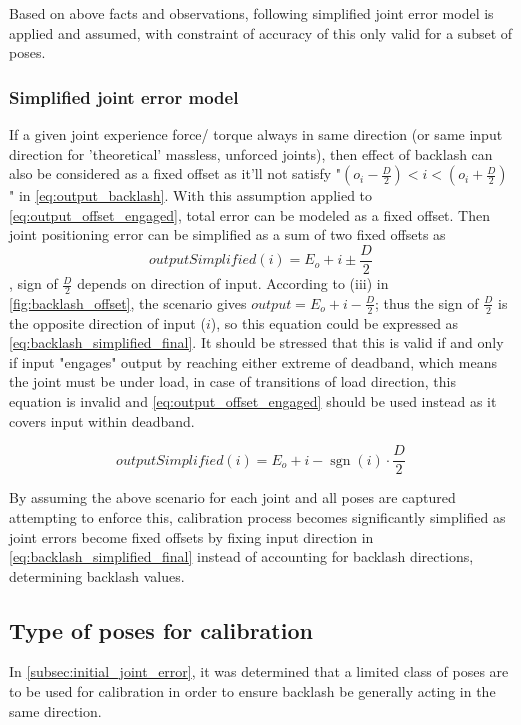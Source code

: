 \documentclass[english, printversion, nomenclature, notitle]{tuvisionthesis} %
\DeclareMathOperator{\sgn}{sgn}
\begin{document}
Based on above facts and observations, following simplified joint error model is applied and assumed, with constraint of accuracy of this only valid for a subset of poses.

\subsubsection{Simplified joint error model}
\label{subsubsec:simplified_joint_error_model}
If a given joint experience force/ torque always in same direction (or same input direction for 'theoretical' massless, unforced joints), then effect of backlash can also be considered as a fixed offset as it'll not satisfy "$(o_i - \frac{D}{2}) < i < (o_i + \frac{D}{2})$" in \cref{eq:output_backlash}. With this assumption applied to \cref{eq:output_offset_engaged}, total error can be modeled as a fixed offset. Then joint positioning error can be simplified as a sum of two fixed offsets as \[outputSimplified(i) = E_o + i \pm \frac{D}{2}\], sign of $\frac{D}{2}$ depends on direction of input. According to (iii) in \cref{fig:backlash_offset}, the scenario gives $output = E_o + i - \frac{D}{2}$; thus the sign of $\frac{D}{2}$ is the opposite direction of input ($i$), so this equation could be expressed as \cref{eq:backlash_simplified_final}. It should be stressed that this is valid if and only if input "engages" output by reaching either extreme of deadband, which means the joint must be under load, in case of transitions of load direction, this equation is invalid and \cref{eq:output_offset_engaged} should be used instead as it covers input within deadband.

\begin{equation}
outputSimplified(i) = E_o + i -\sgn(i)\cdot\frac{D}{2}
\label{eq:backlash_simplified_final}
\end{equation}

By assuming the above scenario for each joint and all poses are captured attempting to enforce this, calibration process becomes significantly simplified as joint errors become fixed offsets by fixing input direction in \cref{eq:backlash_simplified_final} instead of accounting for backlash directions, determining backlash values.

\subsection{Type of poses for calibration}

In \cref{subsec:initial_joint_error}, it was determined that a limited class of poses are to be used for calibration in order to ensure backlash be generally acting in the same direction.
\end{document}
